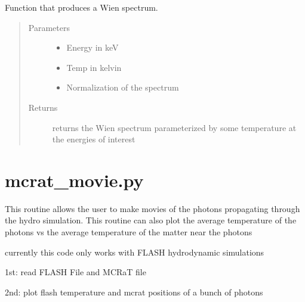 \documentclass[letterpaper,10pt,english]{sphinxmanual}
\begin{document}
\begin{fulllineitems}
\label{\detokenize{read_process_files:read_process_files.wien}}
Function that produces a Wien spectrum.
\begin{quote}\begin{description}
\item[{Parameters}] \leavevmode\begin{itemize}
\item {} 
 \textendash{} Energy in keV

\item {} 
 \textendash{} Temp in kelvin

\item {} 
 \textendash{} Normalization of the spectrum

\end{itemize}

\item[{Returns}] \leavevmode
returns the Wien spectrum parameterized by some temperature at the energies of interest

\end{description}\end{quote}

\end{fulllineitems}



\chapter{mcrat\_movie.py}
\label{\detokenize{mcrat_movie:module-mcrat_movie}}\label{\detokenize{mcrat_movie:mcrat-movie-py}}\label{\detokenize{mcrat_movie::doc}}
This routine allows the user to make movies of the photons propagating through the hydro simulation.
This routine can also plot the average temperature of the photons vs the average temperature of the matter near the photons

currently this code only works with FLASH hydrodynamic simulations

1st: read FLASH File and MCRaT file

2nd: plot flash temperature and mcrat positions of a bunch of photons
\end{document}
